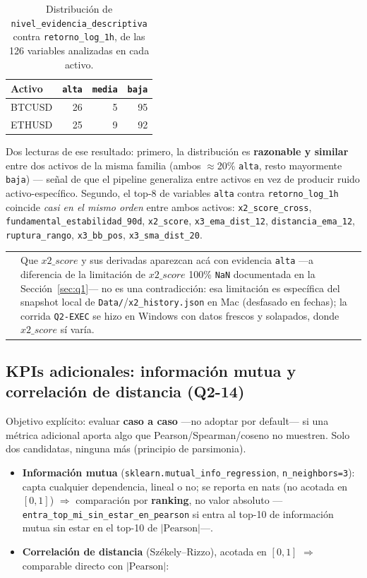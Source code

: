 \documentclass[11pt,a4paper]{article}
\makeatletter
\newcommand{\code}[1]{\texttt{\small #1}}
\newenvironment{nota}{%
  \par\medskip\noindent
  \begin{tabular}{@{}p{0.4em}@{\hspace{8pt}}p{\dimexpr\linewidth-2em\relax}@{}}
  \textcolor{cnaranja}{\rule{3pt}{1.1em}} &
}{\end{tabular}\par\medskip}
\makeatother
\begin{document}
\begin{table}[h]
\centering
\small
\begin{tabular}{@{}l r r r@{}}
\toprule
Activo & \code{alta} & \code{media} & \code{baja} \\
\midrule
BTCUSD & 26 & 5 & 95 \\
ETHUSD & 25 & 9 & 92 \\
\bottomrule
\end{tabular}
\caption{Distribución de \code{nivel\_evidencia\_descriptiva} contra
\code{retorno\_log\_1h}, de las 126 variables analizadas en cada activo.}
\end{table}

Dos lecturas de ese resultado: primero, la distribución es \textbf{razonable y similar}
entre dos activos de la misma familia (ambos \(\approx\)20\% \code{alta}, resto
mayormente \code{baja}) — señal de que el pipeline generaliza entre activos en vez de
producir ruido activo-específico. Segundo, el top-8 de variables \code{alta} contra
\code{retorno\_log\_1h} coincide \emph{casi en el mismo orden} entre ambos activos:
\code{x2\_score\_cross}, \code{fundamental\_estabilidad\_90d}, \code{x2\_score},
\code{x3\_ema\_dist\_12}, \code{distancia\_ema\_12}, \code{ruptura\_rango},
\code{x3\_bb\_pos}, \code{x3\_sma\_dist\_20}.

\begin{nota}
Que \(x2\_score\) y sus derivadas aparezcan acá con evidencia \code{alta} —a diferencia de
la limitación de \(x2\_score\) 100\% \code{NaN} documentada en la
Sección~\ref{sec:q1}— no es una contradicción: esa limitación es específica del snapshot
local de \code{Data/}/\code{x2\_history.json} en Mac (desfasado en fechas); la corrida
\code{Q2-EXEC} se hizo en Windows con datos frescos y solapados, donde \(x2\_score\) sí
varía.
\end{nota}

\subsection{KPIs adicionales: información mutua y correlación de distancia (Q2-14)}

Objetivo explícito: evaluar \textbf{caso a caso} —no adoptar por default— si una métrica
adicional aporta algo que Pearson/Spearman/coseno no muestren. Solo dos candidatas, ninguna
más (principio de parsimonia).

\begin{itemize}[leftmargin=1.4em,itemsep=2pt]
\item \textbf{Información mutua} (\code{sklearn.mutual\_info\_regression},
  \code{n\_neighbors=3}): capta cualquier dependencia, lineal o no; se reporta en nats
  (no acotada en \([0,1]\)) \(\Rightarrow\) comparación por \textbf{ranking}, no valor
  absoluto —\code{entra\_top\_mi\_sin\_estar\_en\_pearson} si entra al top-10 de
  información mutua sin estar en el top-10 de \(|\text{Pearson}|\)—.
\item \textbf{Correlación de distancia} (Székely–Rizzo), acotada en \([0,1]\)
  \(\Rightarrow\) comparable directo con \(|\text{Pearson}|\):
\end{itemize}
\end{document}

